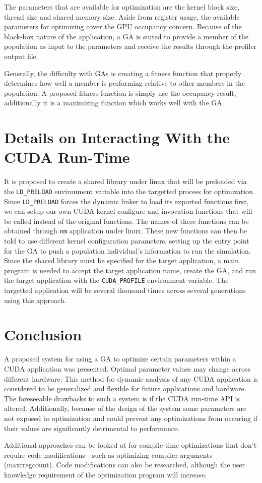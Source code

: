 The parameters that are available for optimization are the kernel block size, thread size and shared memory size. Aside from register usage, the available parameters for optimizing cover the GPU occupancy concern. Because of the black-box nature of the application, a GA is suited to provide a member of the population as input to the parameters and receive the results through the profiler output file.

Generally, the difficulty with GAs is creating a fitness function that properly determines how well a member is performing relative to other members in the population. A proposed fitness function is simply use the occupancy result, additionally it is a maximizing function which works well with the GA.

\section{Details on Interacting With the CUDA Run-Time}
It is proposed to create a shared library under linux that will be preloaded via the \texttt{LD\_PRELOAD} environment variable into the targetted process for optimization. Since \texttt{LD\_PRELOAD} forces the dynamic linker to load its exported functions first, we can setup our own CUDA kernel configure and invocation functions that will be called instead of the original functions. The names of these functions can be obtained through \texttt{nm} application under linux. These new functions can then be told to use different kernel configuration parameters, setting up the entry point for the GA to push a population individual's information to run the simulation. Since the shared library must be specified for the target application, a main program is needed to accept the target application name, create the GA, and run the target application with the \texttt{CUDA\_PROFILE} environment variable. The targetted application will be several thousand times across several generations using this approach.

\section{Conclusion}
A proposed system for using a GA to optimize certain parameters within a CUDA application was presented. Optimal parameter values may change across different hardware. This method for dynamic analysis of any CUDA application is considered to be generalized and flexible for future applications and hardware. The foreseeable drawbacks to such a system is if the CUDA run-time API is altered. Additionally, because of the design of the system some parameters are not exposed to optimization and could prevent any optimizations from occuring if their values are significantly detrimental to performance.

Additional approaches can be looked at for compile-time optimizations that don’t require code modifications - such as optimizing compiler arguments (maxrregcount). Code modifications can also be researched, although the user knowledge requirement of the optimization program will increase.

\newpage

\cite*{}



